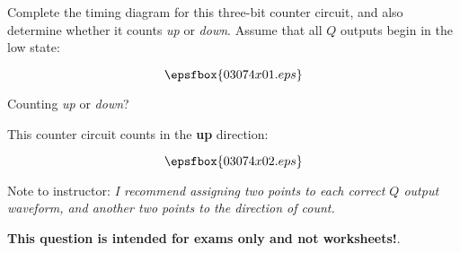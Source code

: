

Complete the timing diagram for this three-bit counter circuit, and also determine whether it counts {\it up} or {\it down}.  Assume that all $Q$ outputs begin in the low state:

$$\epsfbox{03074x01.eps}$$

Counting {\it up} or {\it down}?







This counter circuit counts in the {\bf up} direction:

$$\epsfbox{03074x02.eps}$$

Note to instructor: {\it I recommend assigning two points to each correct $Q$ output waveform, and another two points to the direction of count.}







{\bf This question is intended for exams only and not worksheets!}.




